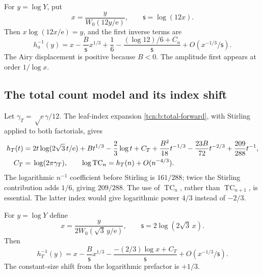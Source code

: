\documentclass[11pt,letterpaper]{article}
\newcommand{\ee}{\mathrm e}
\newcommand{\TC}{\operatorname{TC}}
\theoremstyle{remark}
\begin{document}
For $y=\log Y$, put
\[
 x=\frac{y}{W_0(12y/\ee)},\qquad \mathsf s=\log(12x).
\]
Then $x\log(12x/\ee)=y$, and the first inverse terms are
\begin{equation}
 h_a^{-1}(y)=x-\frac B{\mathsf s}x^{1/3}+\frac16
        -\frac{(\log12)/6+C_a}{\mathsf s}+O(x^{-1/3}/\mathsf s).             \label{tcn:b:inverse-a}
\end{equation}
The Airy displacement is positive because $B<0$. The amplitude first appears at order $1/\log x$.

\subsection{The total count model and its index shift}
Let $\gamma_T=\sqrt\ee\,\gamma/12$. The leaf-index expansion \eqref{tcn:b:total-forward}, with Stirling applied to both factorials, gives
\begin{align}
 h_T(t)={}&2t\log(2\sqrt3\,t/\ee)+Bt^{1/3}-\frac23\log t+C_T
         +\frac{B^2}{18}t^{-1/3}-\frac{23B}{72}t^{-2/3}
         +\frac{209}{288}t^{-1},\notag\\
 C_T={}&\log(2\pi\gamma_T),\qquad
 \log\TC_n=h_T(n)+O(n^{-4/3}).                             \label{tcn:b:ht}
\end{align}
The logarithmic $n^{-1}$ coefficient before Stirling is $161/288$; twice the Stirling contribution adds $1/6$, giving $209/288$. The use of $\TC_n$, rather than $\TC_{n+1}$, is essential. The latter index would give logarithmic power $4/3$ instead of $-2/3$.

For $y=\log Y$ define
\[
 x=\frac{y}{2W_0(\sqrt3\,y/\ee)},\qquad \mathsf s=2\log(2\sqrt3\,x).
\]
Then
\begin{equation}
 h_T^{-1}(y)=x-\frac B{\mathsf s}x^{1/3}
       -\frac{-(2/3)\log x+C_T}{\mathsf s}+O(x^{-1/3}/\mathsf s).           \label{tcn:b:inverse-total}
\end{equation}
The constant-size shift from the logarithmic prefactor is $+1/3$.
\end{document}
